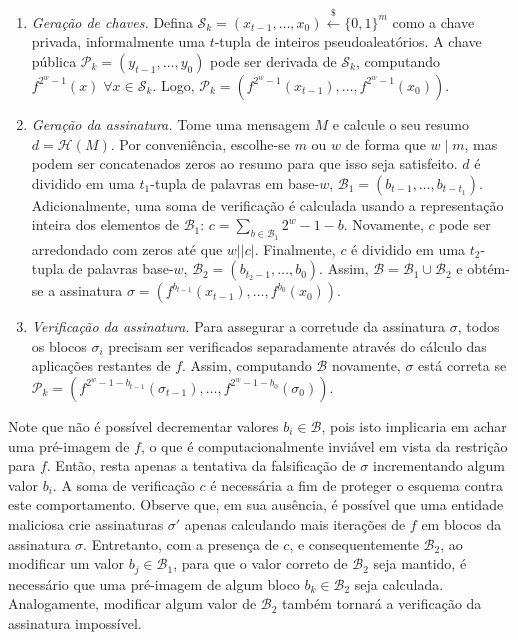 \documentclass[12pt]{report}
\newcommand{\pk}{$\mathcal{P}_k$}
\newcommand{\sk}{$\mathcal{S}_k$}
\newcommand{\binwds}[1]{\{0, 1\}^{#1}}
\newcommand{\length}[1]{\vert #1 \vert}
\begin{document}
\begin{enumerate}

    \item[] \emph{Geração de chaves.} Defina $\text{\sk{}} = (x_{t-1}, \dots, x_0) \stackrel{\$}{\longleftarrow} \binwds{m}$ como a chave privada, informalmente uma $t$-tupla de inteiros pseudoaleatórios. A chave pública $\text{\pk{}} = (y_{t-1}, \dots, y_0)$ pode ser derivada de \sk{}, computando $f^{2^{w}-1}(x) \; \forall x \in  \text{\sk{}}$. Logo, $\text{\pk{}} = (f^{2^{w}-1}(x_{t-1}), \dots, f^{2^{w}-1}(x_0))$.

    \item[] \emph{Geração da assinatura.} Tome uma mensagem $M$ e calcule o seu resumo $d = \mathcal{H}(M)$. Por conveniência, escolhe-se $m$ ou $w$ de forma que $w \mid m$, mas podem ser concatenados zeros ao resumo para que isso seja satisfeito. $d$ é dividido em uma $t_1$-tupla de palavras em base-$w$, $\mathcal{B}_1 = (b_{t-1}, \dots, b_{t-t_1})$. 
    Adicionalmente, uma soma de verificação é calculada usando a representação inteira dos elementos de $\mathcal{B}_1$: $c = \sum_{b \in \mathcal{B}_1} 2^w - 1 - b$. Novamente, $c$ pode ser arredondado com zeros até que $w \mid \length{c}$. Finalmente, $c$ é dividido em uma $t_2$-tupla de palavras base-$w$, $\mathcal{B}_2 = (b_{t_2-1}, \dots, b_0)$. Assim, $\mathcal{B} = \mathcal{B}_1 \cup \mathcal{B}_2$ e obtém-se a assinatura $\sigma = (f^{b_{t-1}}(x_{t-1}), \dots, f^{b_0}(x_0)).$
    
    \item[] \emph{Verificação da assinatura.} Para assegurar a corretude da assinatura $\sigma$, todos os blocos $\sigma_i$ precisam ser verificados separadamente através do cálculo das aplicações restantes de $f$. Assim, computando $\mathcal{B}$ novamente, $\sigma$ está correta se $\text{\pk{}} = (f^{2^w - 1 - b_{t-1}}(\sigma_{t-1}), \dots, f^{2^w - 1 - b_0}(\sigma_0))$.
    
\end{enumerate}

Note que não é possível decrementar valores $b_i \in \mathcal{B}$, pois isto implicaria em achar uma pré-imagem de $f$, o que é computacionalmente inviável em vista da restrição para $f$. Então, resta apenas a tentativa da falsificação de $\sigma$ incrementando algum valor $b_i$. A soma de verificação $c$ é necessária a fim de proteger o esquema contra este comportamento. Observe que, em sua ausência, é possível que uma entidade maliciosa crie assinaturas $\sigma'$ apenas calculando mais iterações de $f$ em blocos da assinatura $\sigma$. Entretanto, com a presença de $c$, e consequentemente $\mathcal{B}_2$, ao modificar um valor $b_j \in \mathcal{B}_1$, para que o valor correto de $\mathcal{B}_2$ seja mantido, é necessário que uma pré-imagem de algum bloco $b_k \in \mathcal{B}_2$ seja calculada. Analogamente, modificar algum valor de $\mathcal{B}_2$ também tornará a verificação da assinatura impossível.
\end{document}
